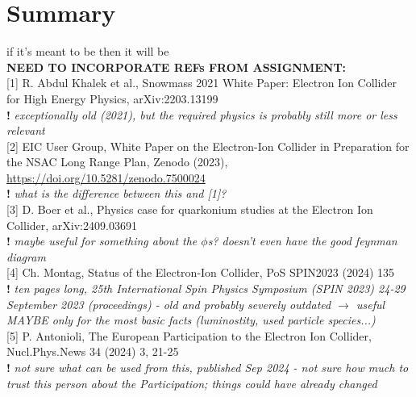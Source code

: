\chapter*{Summary}\label{cha:outro} %

if it's meant to be then it will be\\

\textbf{NEED TO INCORPORATE REFs FROM ASSIGNMENT:}\\

[1] R. Abdul Khalek et al., Snowmass 2021 White Paper: Electron Ion Collider for High Energy Physics, arXiv:2203.13199\\
\textbf{!} \textit{exceptionally old (2021), but the required physics is probably still more or less relevant}\\

[2] EIC User Group,  White Paper on the Electron-Ion Collider in Preparation for the NSAC Long Range Plan, Zenodo (2023), \url{https://doi.org/10.5281/zenodo.7500024}\\
\textbf{!} \textit{what is the difference between this and [1]?}\\

[3] D. Boer et al., Physics case for quarkonium studies at the Electron Ion Collider, arXiv:2409.03691\\
\textbf{!} \textit{maybe useful for something about the $\phi$s? doesn't even have the good feynman diagram}\\

[4] Ch. Montag, Status of the Electron-Ion Collider, PoS SPIN2023 (2024) 135\\
\textbf{!} \textit{ten pages long, 25th International Spin Physics Symposium (SPIN 2023) 24-29 September 2023 (proceedings) - old and probably severely outdated $\rightarrow$ useful MAYBE only for the most basic facts (luminostity, used particle species...)}\\

[5] P. Antonioli, The European Participation to the Electron Ion Collider, Nucl.Phys.News 34 (2024) 3, 21-25\\
\textbf{!} \textit{not sure what can be used from this, published Sep 2024 - not sure how much to trust this person about the Participation; things could have already changed}


